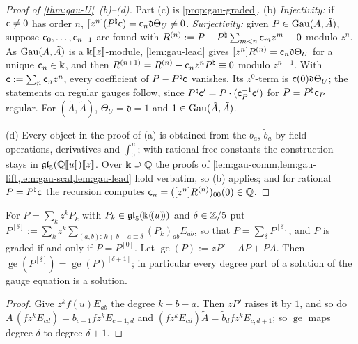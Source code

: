 \begin{proof}[Proof of \cref{thm:gau-U}~(b)--(d)]
Part (c) is \cref{prop:gau-graded}. (b) \emph{Injectivity:} if $\mathsf{c}\neq0$ has order $n$, $[z^n](P^\natural\mathsf{c})=\mathsf{c}_n\mathfrak d\Theta_U\neq0$. \emph{Surjectivity:} given $P\in\operatorname{Gau}(A,\tilde A)$, suppose $\mathsf{c}_0,\dots,\mathsf{c}_{n-1}$ are found with $R^{(n)}:=P-P^\natural\sum_{m<n}\mathsf{c}_mz^m\equiv0$ modulo $z^n$. As $\operatorname{Gau}(A,\tilde A)$ is a $\Bbbk[\![ z ]\!]$-module, \cref{lem:gau-lead} gives $[z^n]R^{(n)}=\mathsf{c}_n\mathfrak d\Theta_U$ for a unique $\mathsf{c}_n\in\Bbbk$, and then $R^{(n+1)}=R^{(n)}-\mathsf{c}_nz^nP^\natural\equiv0$ modulo $z^{n+1}$. With $\mathsf{c}:=\sum_n\mathsf{c}_nz^n$, every coefficient of $P-P^\natural\mathsf{c}$ vanishes. Its $z^0$-term is $\mathsf{c}(0)\mathfrak d\Theta_U$; the statements on regular gauges follow, since $P^\natural\mathsf{c}'=P\cdot(\mathsf{c}_P^{-1}\mathsf{c}')$ for $P=P^\natural\mathsf{c}_P$ regular. For $(\tilde A,\tilde A)$, $\Theta_U=\mathfrak d=1$ and $1\in\operatorname{Gau}(\tilde A,\tilde A)$.

(d) Every object in the proof of (a) is obtained from the $b_a$, $\tilde b_a$ by field operations, derivatives and $\int_0^u$; with rational free constants the construction stays in $\mathfrak{gl}_5(\mathbb{Q}[\![ u ]\!])[\![ z ]\!]$. Over $\Bbbk\supseteq\mathbb{Q}$ the proofs of \cref{lem:gau-comm,lem:gau-lift,lem:gau-scal,lem:gau-lead} hold verbatim, so (b) applies; and for rational $P=P^\natural\mathsf{c}$ the recursion computes $\mathsf{c}_n=([z^n]R^{(n)})_{00}(0)\in\mathbb{Q}$.
\end{proof}

\begin{lem}
\label{lem:gau-degree}
For $P=\sum_kz^kP_k$ with $P_k\in\mathfrak{gl}_5(\Bbbk(\!(u)\!))$ and $\delta\in\mathbb{Z}/5$ put $P^{[\delta]}:=\sum_kz^k\sum_{(a,b):\,k+b-a\equiv\delta}(P_k)_{ab}E_{ab}$, so that $P=\sum_\delta P^{[\delta]}$, and $P$ is graded if and only if $P=P^{[0]}$. Let $\operatorname{ge}(P):=zP'-AP+P\tilde A$. Then $\operatorname{ge}(P^{[\delta]})=\operatorname{ge}(P)^{[\delta+1]}$; in particular every degree part of a solution of the gauge equation is a solution.
\end{lem}

\begin{proof}
Give $z^kf(u)E_{ab}$ the degree $k+b-a$. Then $zP'$ raises it by $1$, and so do $A\,(fz^kE_{cd})=b_{c-1}fz^kE_{c-1,d}$ and $(fz^kE_{cd})\tilde A=\tilde b_dfz^kE_{c,d+1}$; so $\operatorname{ge}$ maps degree $\delta$ to degree $\delta+1$.
\end{proof}

